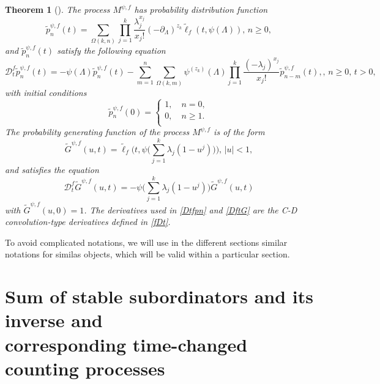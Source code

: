 \documentclass[12pt]{article}
\theoremstyle{definition}
\theoremstyle{plain}
\newtheorem{theorem}{Theorem}
\begin{document}
\begin{theorem}[\cite{BS2024}]\label{Th5}
   	 The process ${M}^{\psi,f}$ has probability distribution function
   	 \begin{equation}\label{pnpsif}
   	          \tilde{p}_n^{\psi,f}(t)=\sum_{\Omega(k,n)}^{}\prod_{j=1}^{k}\frac{\lambda_j ^{x_j}}{x_j!}\left(-\partial_{\Lambda}\right)^{z_k}\tilde{\ell}_f(t,\psi (\Lambda)), \, n\ge 0,
    	\end{equation}
    	and $\tilde{p}_n^{\psi,f}(t)$ satisfy the following equation
    	\begin{equation}
   		 \mathcal{D}^f_t \tilde{p}_n^{\psi,f}(t)=-\psi(\Lambda)\tilde{p}_n^{\psi,f}(t) -\sum_{m=1}^{n}\sum_{\Omega(k,m)}^{}\psi^{(z_k)}\left(\Lambda\right) \prod_{j=1}^{k}\frac{(-\lambda_j )^{x_j}}{x_j!}\tilde{p}_{n-m}^{\psi,f}(t),\label{Dtfpn}, \, n\ge 0, \,t>0,
  	\end{equation}
   	 with initial conditions 
    \begin{equation*}
         \tilde{p}_n^{\psi,f}(0)=
         \begin{cases}
                1,\quad n=0,\\
                0,\quad n\geq1.\\
         \end{cases}
     \end{equation*}
        The probability generating function of the process ${M}^{\psi,f}$ is of the form
\begin{equation}\label{Gpsif1}
             \tilde G^{\psi,f}(u,t)=\tilde \ell_f\Big(t, \psi\Big(\sum_{j=1}^{k}\lambda_j(1-u^j)\Big)\Big),\, |u|<1,
\end{equation}
and satisfies the equation
\begin{equation}\label{DftG}
        	\mathcal{D}^f_t \tilde G^{\psi,f}(u,t)=-\psi\Big(\sum_{j=1}^{k}\lambda_j(1-u^j)\Big)\tilde G^{\psi,f}(u,t)
    \end{equation}
    with $\tilde G^{\psi,f}(u,0)=1$.
    The derivatives used in \eqref{Dtfpn} and \eqref{DftG} are the C-D convolution-type derivatives defined in \eqref{fDt}.
\end{theorem}
 To avoid complicated notations, we will use in the different sections similar notations for similas objects, which will be valid within a particular section.

\section{Sum of stable subordinators and its inverse and \\corresponding time-changed counting processes}
\end{document}
